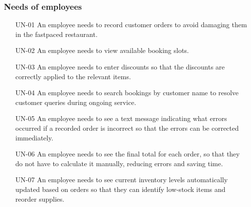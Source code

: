 \documentclass[]{VUMIFTemplateClass}
\newcommand{\todocomment}[1]{%
    \begin{tcolorbox}[colback=red!20, colframe=red!60, arc=0pt, outer arc=0pt, boxrule=1pt, left=3pt, right=3pt, top=3pt, bottom=3pt]
        \textbf{\textcolor{orange!70!black}{TODO:}} #1
    \end{tcolorbox}
}
\begin{document}
\subsubsection{Needs of employees}
\begin{itemize}
    \item[UN-01]\label{UN-01} An employee needs to record customer orders to avoid damaging them in the fastpaced restaurant.
   
    \item[UN-02]\label{UN-02} An employee needs to view available booking slots.

    \item[UN-03]\label{UN-03} An employee needs to enter discounts so that the discounts are correctly applied to the relevant items.

    
    \item[UN-04]\label{UN-04} An employee needs to search bookings by customer name to resolve customer queries during ongoing service.
    \item[UN-05]\label{UN-05} An employee needs to see a text message indicating what errors occurred if a recorded order is incorrect so that the errors can be corrected immediately.
    \item[UN-06]\label{UN-06} An employee needs to see the final total for each order, so that they do not have to calculate it manually, reducing errors and saving time.
    \item[UN-07]\label{UN-07} An employee needs to see current inventory levels automatically updated based on orders so that they can identify low-stock items and reorder supplies.

\end{itemize}
\end{document}
